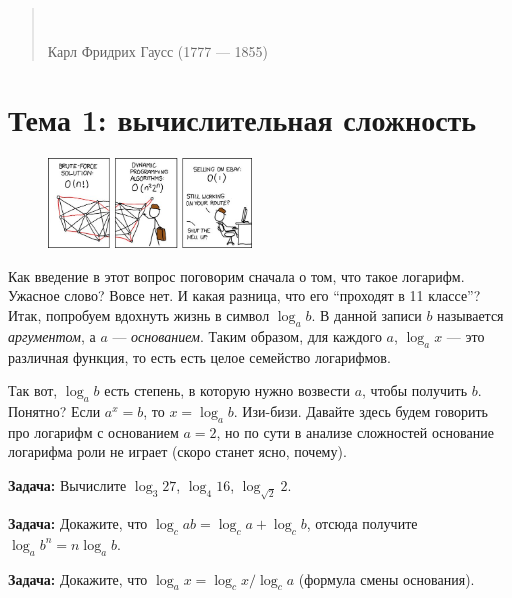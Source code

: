 \documentclass[12pt]{article}
\begin{document}
\begin{quote}
\it {}\\
\begin{flushright}
Карл Фридрих Гаусс (1777 --- 1855)
\end{flushright}
\end{quote}

\newpage

\section*{Тема 1: вычислительная сложность}
\begin{figure}
  \begin{center}
    \includegraphics[width=0.48\textwidth]{compjoke.jpg}
  \end{center}
\end{figure}
Как введение в этот вопрос поговорим сначала о том, что такое логарифм. Ужасное слово? Вовсе нет. И какая разница, что его ``проходят в 11 классе''? Итак, попробуем вдохнуть жизнь в символ $\log_a b$. В данной записи $b$ называется {\it аргументом}, а $a$ --- {\it основанием}. Таким образом, для каждого $a$, $\log_a x$ --- это различная функция, то есть есть целое семейство логарифмов.

Так вот, $\log_a b$ есть степень, в которую нужно возвести $a$, чтобы получить $b$. Понятно? Если $a^x = b$, то $x = \log_a b$. Изи-бизи. Давайте здесь будем говорить про логарифм с основанием $a = 2$, но по сути в анализе сложностей основание логарифма роли не играет (скоро станет ясно, почему). 

{\bf Задача:} Вычислите $\log_3 27$, $\log_4 16$, $\log_{\sqrt{2}} 2$.

{\bf Задача:} Докажите, что $\log_c ab = \log_c a + \log_c b$, отсюда получите $\log_a b^n = n \log_a b$.

{\bf Задача:} Докажите, что $\log_a x = \log_c x / \log_c a$ (формула смены основания).
\end{document}
